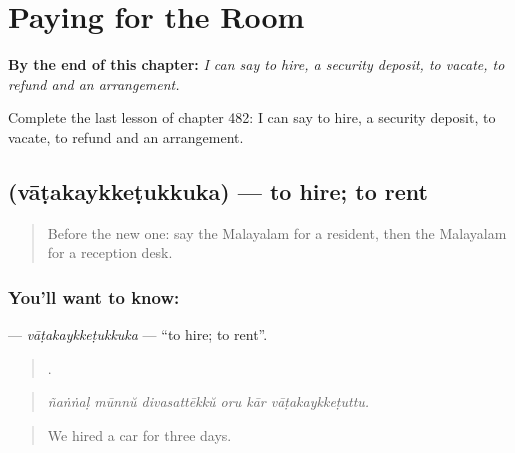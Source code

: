 
\chapter{Paying for the Room}
\label{ch:ml-paying-for-the-room}

\begin{chapteropening}
\textbf{By the end of this chapter:} \emph{I can say to hire, a security deposit, to vacate, to refund and an arrangement.}

Complete the last lesson of chapter 482: I can say to hire, a security deposit, to vacate, to refund and an arrangement.
\end{chapteropening}

\section[\texorpdfstring{\ml{വാടകയ്ക്കെടുക്കുക} (vāṭakaykkeṭukkuka)}{വാടകയ്ക്കെടുക്കുക (vāṭakaykkeṭukkuka)}]{ (vāṭakaykkeṭukkuka) — to hire; to rent}

\label{lesson:ML-C482-vatakaykketukkuka}



\begin{quote}
Before the new one: say the Malayalam for a resident, then the Malayalam for a reception desk.
\end{quote}

\subsection*{You'll want to know: }
\textbf{} — \emph{vāṭakaykkeṭukkuka} — \textquotedblleft{}to hire; to rent\textquotedblright{}.

\begin{quote}
     .
\end{quote}

\begin{quote}
\emph{ñaṅṅaḷ mūnnŭ divasattēkkŭ oru kār vāṭakaykkeṭuttu.}
\end{quote}

\begin{quote}
We hired a car for three days.
\end{quote}

